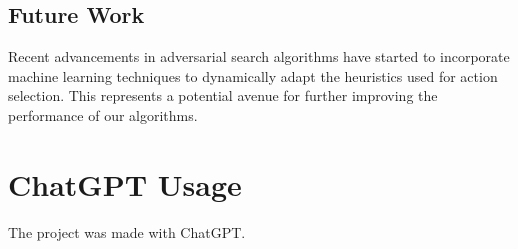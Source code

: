 \documentclass{article}
\begin{document}
\subsection{Future Work}
 Recent advancements in adversarial search algorithms have
 started to incorporate machine learning techniques to dynamically 
 adapt the heuristics used for action selection. 
 This represents a potential avenue for further improving 
 the performance of our algorithms.
 
\section{ChatGPT Usage}
The project was made with ChatGPT.
\end{document}
